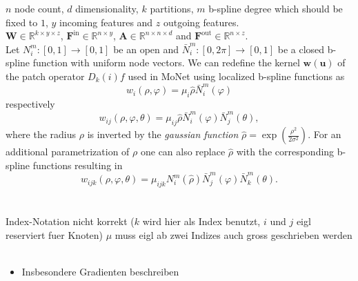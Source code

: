 \documentclass[pdftex,10pt,a4paper]{scrartcl}
\begin{document}
$n$ node count,
$d$ dimensionality,
$k$ partitions,
$m$ b-spline degree which should be fixed to $1$,
$y$ incoming features and
$z$ outgoing features.
\\
$\mathbf{W} \in \mathbb{R}^{k \times y \times z}$,
$\mathbf{F}^{\mathrm{in}} \in \mathbb{R}^{n \times y}$,
$\mathbf{A} \in \mathbb{R}^{n \times n \times d}$ and
$\mathbf{F}^{\mathrm{out}} \in \mathbb{R}^{n \times z}$.
\\
Let $N_i^m \colon [0, 1] \to [0, 1]$ be an open and $\bar{N}_i^m \colon [0, 2\pi] \to [0, 1]$ be a closed b-spline function with uniform node vectors.
We can redefine the kernel $\mathbf{w}(\mathbf{u})$ of the patch operator $D_k(i)f$ used in MoNet using localized b-spline functions as
\begin{equation*}
  w_i(\rho, \varphi) = \mu_i \hat{\rho} \bar{N}_i^m(\varphi)
\end{equation*}
respectively
\begin{equation*}
  w_{ij}(\rho, \varphi, \theta) = \mu_{ij} \hat{\rho} \bar{N}_i^m(\varphi) \bar{N}_j^m(\theta),
\end{equation*}
where the radius $\rho$ is inverted by the \emph{gaussian function} $\hat{\rho} = \exp(\frac{\rho^2}{2\sigma^2})$.
For an additional parametrization of $\rho$ one can also replace $\hat{\rho}$ with the corresponding b-spline functions resulting in
\begin{equation*}
  w_{ijk}(\rho, \varphi, \theta) = \mu_{ijk} N_i^m(\hat{\rho}) \bar{N}_j^m(\varphi) \bar{N}_k^m(\theta).
\end{equation*}
\\\\
Index-Notation nicht korrekt ($k$ wird hier als Index benutzt, $i$ und $j$ eigl reserviert fuer Knoten)
$\mu$ muss eigl ab zwei Indizes auch gross geschrieben werden
\\\\








\newpage


\begin{itemize}
  \item Insbesondere Gradienten beschreiben
\end{itemize}
\end{document}
